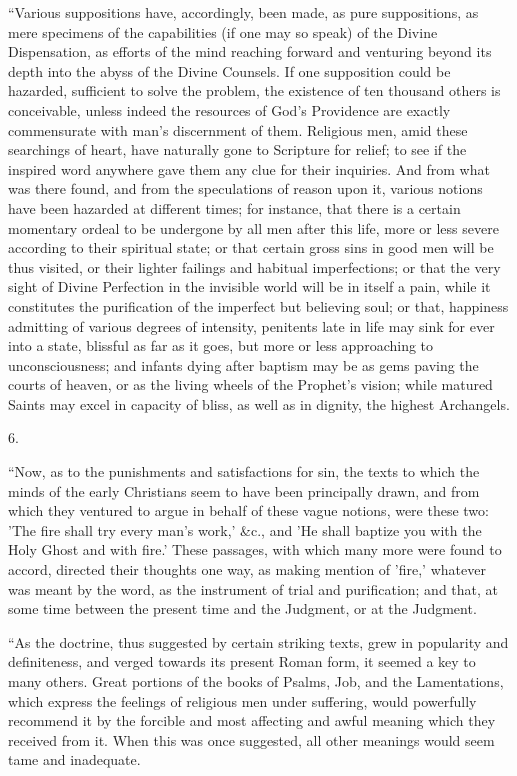 ``Various suppositions have, accordingly, been made, as pure
suppositions, as mere specimens of the capabilities (if one may so
speak) of the Divine Dispensation, as efforts of the mind reaching
forward and venturing beyond its depth into the abyss of the Divine
Counsels. If one supposition could be hazarded, sufficient to solve
the problem, the existence of ten thousand others is conceivable,
unless indeed the resources of God's Providence are exactly
commensurate with man's discernment of them. Religious men, amid these
searchings of heart, have naturally gone to Scripture for relief; to
see if the inspired word anywhere gave them any clue for their
inquiries. And from what was there found, and from the speculations of
reason upon it, various notions have been hazarded at different times;
for instance, that there is a certain momentary ordeal to be undergone
by all men after this life, more or less severe according to their
spiritual state; or that certain gross sins in good men will be thus
visited, or their lighter failings and habitual imperfections; or that
the very sight of Divine Perfection in the invisible world will be in
itself a pain, while it constitutes the purification of the imperfect
but believing soul; or that, happiness admitting of various degrees of
intensity, penitents late in life may sink for ever into a state,
blissful as far as it goes, but more or less approaching to
unconsciousness; and infants dying after baptism may be as gems paving
the courts of heaven, or as the living wheels of the Prophet's vision;
while matured Saints may excel in capacity of bliss, as well as in
dignity, the highest Archangels.

6.

``Now, as to the punishments and satisfactions for sin, the
texts to which the minds of the early Christians seem to have been
principally drawn, and from which they ventured to argue in behalf of
these vague notions, were these two: 'The fire shall try every man's
work,' \&c., and 'He shall baptize you with the Holy Ghost and with
fire.' These passages, with which many more were found to accord,
directed their thoughts one way, as making mention of 'fire,' whatever
was meant by the word, as the instrument of trial and purification;
and that, at some time between the present time and the Judgment, or
at the Judgment.

``As the doctrine, thus suggested by certain striking texts,
grew in popularity and definiteness, and verged towards its present
Roman form, it seemed a key to many others. Great portions of the
books of Psalms, Job, and the Lamentations, which express the feelings
of religious men under suffering, would powerfully recommend it by the
forcible and most affecting and awful meaning which they received from
it. When this was once suggested, all other meanings would seem tame
and inadequate.

